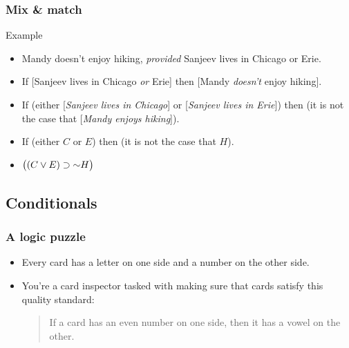 \begin{frame}
  \frametitle{Mix \& match}

  \begin{block}{Example}
    \begin{itemize}[<+->]
      \item[] Mandy doesn't enjoy hiking, \emph{provided} Sanjeev lives in Chicago or Erie.

  \item[] If [Sanjeev lives in Chicago \emph{or} Erie] then [Mandy \emph{doesn't} enjoy hiking].

  \item[] If \big(either [\emph{Sanjeev lives in Chicago}] or [\emph{Sanjeev lives in Erie}]\big)
  then \big(it is not the case that [\emph{Mandy enjoys hiking}]\big).

  \item[] If (either $C$ or $E$)
  then (it is not the case that $H$).

  \item[] $\big((C \lor E) \eif \lnot H \big)$
  \end{itemize}
  \end{block}

\end{frame}

\subsection{Conditionals}

\begin{frame}
  \frametitle{A logic puzzle}

\begin{itemize}
\item Every card has a letter on one side and a number on the other side.
\item You're a card inspector tasked with making sure that cards satisfy this quality standard:

\bigskip
\begin{quote}
If a card has an even number on one side, then it has a vowel on the other.
\end{quote}
\end{itemize}

\end{frame}

